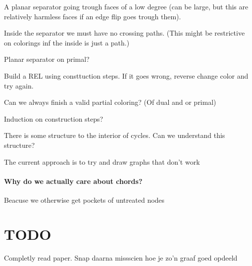 A planar separator going trough faces of a low degree (can be large, but this are relatively harmless faces if an edge flip goes trough them).

Inside the separator we must have no crossing paths. (This might be restrictive on colorings inf the inside is just a path.)

Planar separator on primal?


Build a REL using consttuction steps. If it goes wrong, reverse change color and try again.

Can we always finish a valid partial coloring? (Of dual and or primal)


Induction on construction steps?

There is some structure to the interior of cycles. Can we understand this structure?

The current approach is to try and draw graphs that don't work


\paragraph{Why do we actually care about chords?}
Beacuse we otherwise get pockets of untreated nodes

\section{TODO}
Completly read paper. Snap daarna missscien hoe je zo'n graaf goed opdeeld


\printbibliography

